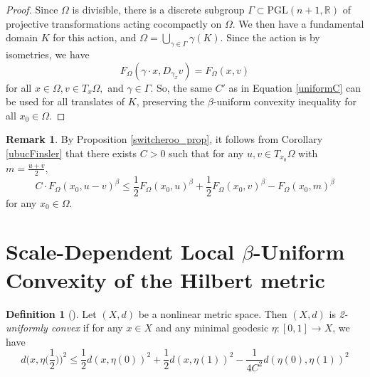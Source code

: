\documentclass[letterpaper, 11pt, reqno]{amsart}
\theoremstyle{definition}
\newtheorem{dfn}[thm]{Definition}
\newtheorem{rem}[thm]{Remark}
\begin{document}
\begin{proof}
    Since $\Omega$ is divisible, there is a discrete subgroup $\Gamma \subset \mathrm{PGL}(n+1,\mathbb{R})$ of projective transformations acting cocompactly on $\Omega$. We then have a fundamental domain $K$ for this action, and $\Omega = \bigcup_{\gamma \in \Gamma} \gamma(K)$. Since the action is by isometries, we have 
    \begin{equation}
        F_\Omega(\gamma \cdot x, D_{\gamma_x}v) = F_\Omega(x,v)
    \end{equation}
    for all $x \in \Omega, v \in T_x\Omega,$ and $\gamma \in \Gamma$. So, the same $C'$ as in Equation \ref{uniformC} can be used for all translates of $K$, preserving the $\beta$-uniform convexity inequality for all $x_0 \in \Omega$.
\end{proof}

\begin{rem}
    By Proposition \ref{switcheroo_prop}, it follows from Corollary \ref{ubucFinsler} that there exists $C > 0$ such that for any $u,v \in T_{x_0}\Omega$ with $m=\frac{u+v}{2},$
    \begin{equation}\label{Finslerswitch}
        C\cdot F_\Omega(x_0,u-v)^\beta \leq \frac{1}{2}F_\Omega(x_0,u)^\beta + \frac{1}{2}F_\Omega(x_0,v)^\beta - F_\Omega(x_0,m)^\beta
    \end{equation}
    for any $x_0 \in \Omega$.
\end{rem}

\section{Scale-Dependent Local $\beta$-Uniform Convexity of the Hilbert metric}\label{sec:future}


\begin{dfn}[\cite{Ohta}]\label{nonlinearizedpuc}
    Let $(X,d)$ be a nonlinear metric space. Then $(X,d)$ is \textit{2-uniformly convex} if for any $x \in X$ and any minimal geodesic $\eta: [0,1] \longrightarrow X$, we have
\begin{equation}\label{eq:2uc}
    d\bigg(x,\eta\bigg(\frac{1}{2}\bigg)\bigg)^2 \leq \frac{1}{2}d(x,\eta(0))^2 + \frac{1}{2}d(x,\eta(1))^2 - \frac{1}{4C^2}d(\eta(0),\eta(1))^2
\end{equation}
\end{dfn}
\end{document}
